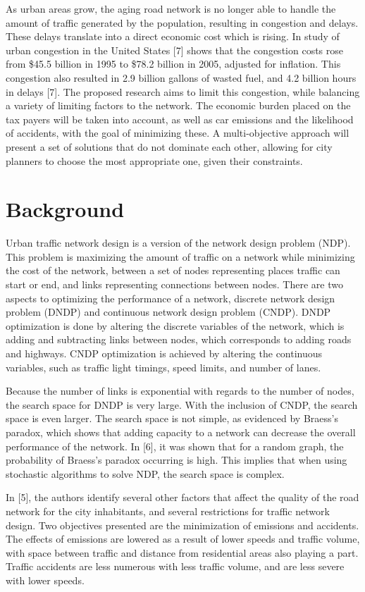 \documentclass[11pt, oneside, notitlepage, draft]{article}
\begin{document}
    As urban areas grow, the aging road network is no longer able to handle the amount of traffic generated by the population, resulting in congestion and delays. These delays translate into a direct economic cost which is rising. In study of urban congestion in the United States [7] shows that the congestion costs rose from \$45.5 billion in 1995 to \$78.2 billion in 2005, adjusted for inflation. This congestion also resulted in 2.9 billion gallons of wasted fuel, and 4.2 billion hours in delays [7]. The proposed research aims to limit this congestion, while balancing a variety of limiting factors to the network. The economic burden placed on the tax payers will be taken into account, as well as car emissions and the likelihood of accidents,  with the goal of minimizing these. A multi-objective approach will present a set of solutions that do not dominate each other, allowing for city planners to choose the most appropriate one, given their constraints.


\section{Background}
    Urban traffic network design is a version of the network design problem (NDP). This problem is maximizing the amount of traffic on a network while minimizing the cost of the network, between a set of nodes  representing places traffic can start or end, and links representing connections between nodes. There are two aspects to optimizing the performance of a network, discrete network design problem (DNDP) and continuous network design problem (CNDP). DNDP optimization is done by altering the discrete variables of the network, which is adding and subtracting links between nodes, which corresponds to adding roads and highways. CNDP optimization is achieved by altering the continuous variables, such as traffic light timings, speed limits, and number of lanes.

    Because the number of links is exponential with regards to the number of nodes, the search space for DNDP is very large. With the inclusion of CNDP, the search space is even larger. The search space is not simple, as evidenced by Braess's paradox, which shows that adding capacity to a network can decrease the overall performance of the network. In [6], it was shown that for a random graph, the probability of Braess's paradox occurring is high. This implies that when using stochastic algorithms to solve NDP, the search space is complex.

    In [5], the authors identify several other factors that affect the quality of the road network for the city inhabitants, and several restrictions for traffic network design. Two objectives presented are the minimization of emissions and accidents. The effects of emissions are lowered as a result of lower speeds and traffic volume, with space between traffic and distance from residential areas also playing a part. Traffic accidents are less numerous with less traffic volume, and are less severe with lower speeds.
\end{document}
